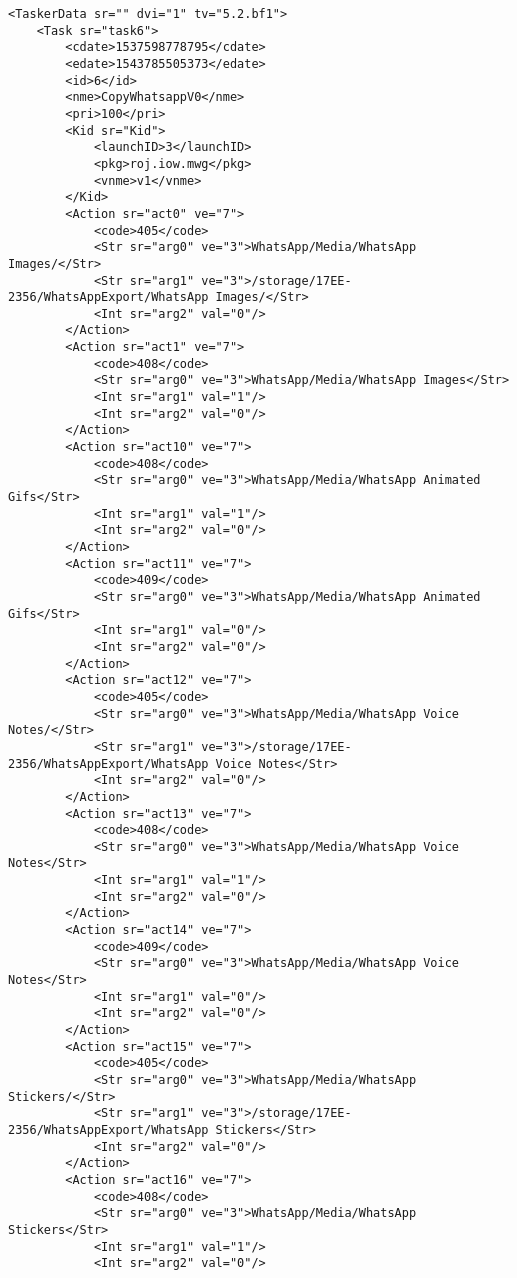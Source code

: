 \begin{verbatim}
<TaskerData sr="" dvi="1" tv="5.2.bf1">
    <Task sr="task6">
        <cdate>1537598778795</cdate>
        <edate>1543785505373</edate>
        <id>6</id>
        <nme>CopyWhatsappV0</nme>
        <pri>100</pri>
        <Kid sr="Kid">
            <launchID>3</launchID>
            <pkg>roj.iow.mwg</pkg>
            <vnme>v1</vnme>
        </Kid>
        <Action sr="act0" ve="7">
            <code>405</code>
            <Str sr="arg0" ve="3">WhatsApp/Media/WhatsApp Images/</Str>
            <Str sr="arg1" ve="3">/storage/17EE-2356/WhatsAppExport/WhatsApp Images/</Str>
            <Int sr="arg2" val="0"/>
        </Action>
        <Action sr="act1" ve="7">
            <code>408</code>
            <Str sr="arg0" ve="3">WhatsApp/Media/WhatsApp Images</Str>
            <Int sr="arg1" val="1"/>
            <Int sr="arg2" val="0"/>
        </Action>
        <Action sr="act10" ve="7">
            <code>408</code>
            <Str sr="arg0" ve="3">WhatsApp/Media/WhatsApp Animated Gifs</Str>
            <Int sr="arg1" val="1"/>
            <Int sr="arg2" val="0"/>
        </Action>
        <Action sr="act11" ve="7">
            <code>409</code>
            <Str sr="arg0" ve="3">WhatsApp/Media/WhatsApp Animated Gifs</Str>
            <Int sr="arg1" val="0"/>
            <Int sr="arg2" val="0"/>
        </Action>
        <Action sr="act12" ve="7">
            <code>405</code>
            <Str sr="arg0" ve="3">WhatsApp/Media/WhatsApp Voice Notes/</Str>
            <Str sr="arg1" ve="3">/storage/17EE-2356/WhatsAppExport/WhatsApp Voice Notes</Str>
            <Int sr="arg2" val="0"/>
        </Action>
        <Action sr="act13" ve="7">
            <code>408</code>
            <Str sr="arg0" ve="3">WhatsApp/Media/WhatsApp Voice Notes</Str>
            <Int sr="arg1" val="1"/>
            <Int sr="arg2" val="0"/>
        </Action>
        <Action sr="act14" ve="7">
            <code>409</code>
            <Str sr="arg0" ve="3">WhatsApp/Media/WhatsApp Voice Notes</Str>
            <Int sr="arg1" val="0"/>
            <Int sr="arg2" val="0"/>
        </Action>
        <Action sr="act15" ve="7">
            <code>405</code>
            <Str sr="arg0" ve="3">WhatsApp/Media/WhatsApp Stickers/</Str>
            <Str sr="arg1" ve="3">/storage/17EE-2356/WhatsAppExport/WhatsApp Stickers</Str>
            <Int sr="arg2" val="0"/>
        </Action>
        <Action sr="act16" ve="7">
            <code>408</code>
            <Str sr="arg0" ve="3">WhatsApp/Media/WhatsApp Stickers</Str>
            <Int sr="arg1" val="1"/>
            <Int sr="arg2" val="0"/>

\end{verbatim}
